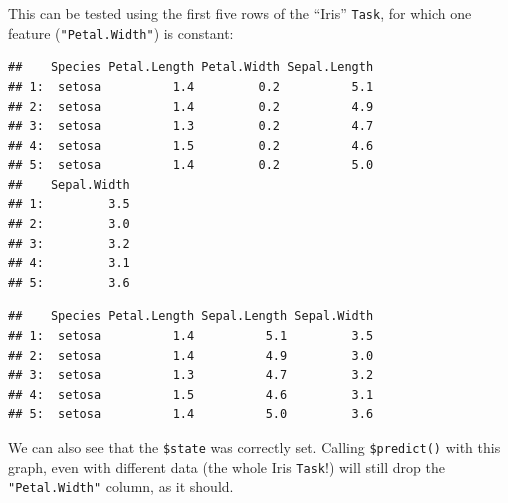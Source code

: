 \documentclass[]{article}
\newenvironment{Shaded}{\begin{snugshade}}{\end{snugshade}}
\newcommand{\DecValTok}[1]{\textcolor[rgb]{0.00,0.00,0.81}{#1}}
\newcommand{\KeywordTok}[1]{\textcolor[rgb]{0.13,0.29,0.53}{\textbf{#1}}}
\newcommand{\NormalTok}[1]{#1}
\newcommand{\OperatorTok}[1]{\textcolor[rgb]{0.81,0.36,0.00}{\textbf{#1}}}
\newcommand{\StringTok}[1]{\textcolor[rgb]{0.31,0.60,0.02}{#1}}
\renewenvironment{Shaded} {\begin{snugshade}\small} {\end{snugshade}}
\begin{document}
This can be tested using the first five rows of the ``Iris'' \texttt{Task}, for which one feature (\texttt{"Petal.Width"}) is constant:

\begin{Shaded}
\end{Shaded}

\begin{verbatim}
##    Species Petal.Length Petal.Width Sepal.Length
## 1:  setosa          1.4         0.2          5.1
## 2:  setosa          1.4         0.2          4.9
## 3:  setosa          1.3         0.2          4.7
## 4:  setosa          1.5         0.2          4.6
## 5:  setosa          1.4         0.2          5.0
##    Sepal.Width
## 1:         3.5
## 2:         3.0
## 3:         3.2
## 4:         3.1
## 5:         3.6
\end{verbatim}

\begin{Shaded}
\end{Shaded}

\begin{verbatim}
##    Species Petal.Length Sepal.Length Sepal.Width
## 1:  setosa          1.4          5.1         3.5
## 2:  setosa          1.4          4.9         3.0
## 3:  setosa          1.3          4.7         3.2
## 4:  setosa          1.5          4.6         3.1
## 5:  setosa          1.4          5.0         3.6
\end{verbatim}

We can also see that the \texttt{\$state} was correctly set. Calling \texttt{\$predict()} with this graph, even with different data (the whole Iris \texttt{Task}!) will still drop the \texttt{"Petal.Width"} column, as it should.
\end{document}
